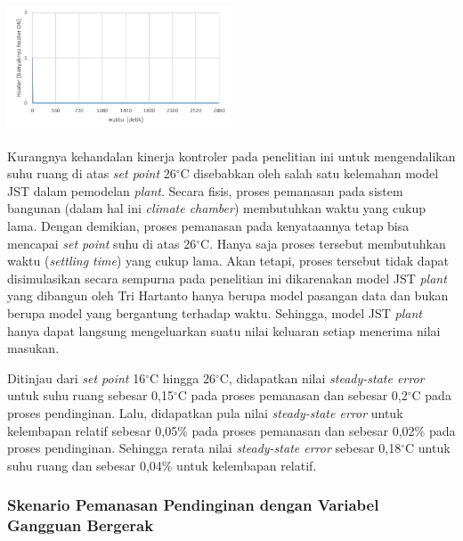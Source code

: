 \documentclass[a4paper,10pt]{article}
\makeatletter
\newenvironment{body}{\begin{multicols}{2}}{\end{multicols}}
\renewenvironment{figure}
{\def\@captype{figure}%
	\captionsetup{labelsep=period,format=hang,font=footnotesize,justification=justified}
}
{}
\makeatother
\begin{document}
\begin{body}
		\begin{figure}
			\centering
			\includegraphics[width=0.5\textwidth]{figures/Simulink1HT}
			\caption{Grafik Variabel Manipulasi \textit{Heater} pada Simulasi Simulink}
			\label{fig:5:SimulinkHT}
		\end{figure}
		\vspace{1em}
		
		Kurangnya kehandalan kinerja kontroler pada penelitian ini untuk mengendalikan suhu ruang di atas \textit{set point} 26$^\circ$C disebabkan oleh salah satu kelemahan model JST dalam pemodelan \textit{plant}. Secara fisis, proses pemanasan pada sistem bangunan (dalam hal ini \textit{climate chamber}) membutuhkan waktu yang cukup lama. Dengan demikian, proses pemanasan pada kenyataannya tetap bisa mencapai \textit{set point} suhu di atas 26$^\circ$C. Hanya saja proses tersebut membutuhkan waktu (\textit{settling time}) yang cukup lama. Akan tetapi, proses tersebut tidak dapat disimulasikan secara sempurna pada penelitian ini dikarenakan model JST \textit{plant} yang dibangun oleh Tri Hartanto\cite{skripsiTanto} hanya berupa model pasangan data dan bukan berupa model yang bergantung terhadap waktu. Sehingga, model JST \textit{plant} hanya dapat langsung mengeluarkan suatu nilai keluaran setiap menerima nilai masukan.
		
		Ditinjau dari \textit{set point} 16$^\circ$C hingga 26$^\circ$C, didapatkan nilai \textit{steady-state error} untuk suhu ruang sebesar 0,15$^\circ$C pada proses pemanasan dan sebesar 0,2$^\circ$C pada proses pendinginan. Lalu, didapatkan pula nilai \textit{steady-state error} untuk kelembapan relatif sebesar 0,05\% pada proses pemanasan dan sebesar 0,02\% pada proses pendinginan. Sehingga rerata nilai \textit{steady-state error} sebesar 0,18$^\circ$C untuk suhu ruang dan sebesar 0,04\% untuk kelembapan relatif.
		
		\subsubsection{Skenario Pemanasan Pendinginan dengan Variabel Gangguan Bergerak}
		

\end{body}
\end{document}
